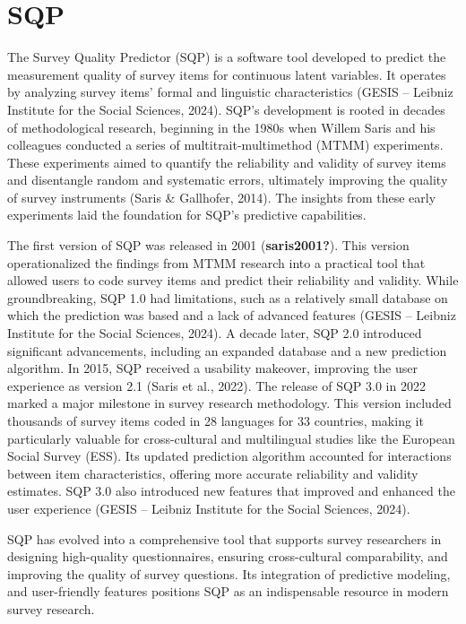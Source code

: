 \documentclass[
  letterpaper,
  DIV=11,
  numbers=noendperiod]{scrartcl}
\begin{document}
\section{SQP}\label{sqp}

The Survey Quality Predictor (SQP) is a software tool developed to
predict the measurement quality of survey items for continuous latent
variables. It operates by analyzing survey items' formal and linguistic
characteristics (GESIS -- Leibniz Institute for the Social Sciences,
2024). SQP's development is rooted in decades of methodological
research, beginning in the 1980s when Willem Saris and his colleagues
conducted a series of multitrait-multimethod (MTMM) experiments. These
experiments aimed to quantify the reliability and validity of survey
items and disentangle random and systematic errors, ultimately improving
the quality of survey instruments (Saris \& Gallhofer, 2014). The
insights from these early experiments laid the foundation for SQP's
predictive capabilities.

The first version of SQP was released in 2001 (\textbf{saris2001?}).
This version operationalized the findings from MTMM research into a
practical tool that allowed users to code survey items and predict their
reliability and validity. While groundbreaking, SQP 1.0 had limitations,
such as a relatively small database on which the prediction was based
and a lack of advanced features (GESIS -- Leibniz Institute for the
Social Sciences, 2024). A decade later, SQP 2.0 introduced significant
advancements, including an expanded database and a new prediction
algorithm. In 2015, SQP received a usability makeover, improving the
user experience as version 2.1 (Saris et al., 2022). The release of SQP
3.0 in 2022 marked a major milestone in survey research methodology.
This version included thousands of survey items coded in 28 languages
for 33 countries, making it particularly valuable for cross-cultural and
multilingual studies like the European Social Survey (ESS). Its updated
prediction algorithm accounted for interactions between item
characteristics, offering more accurate reliability and validity
estimates. SQP 3.0 also introduced new features that improved and
enhanced the user experience (GESIS -- Leibniz Institute for the Social
Sciences, 2024).

SQP has evolved into a comprehensive tool that supports survey
researchers in designing high-quality questionnaires, ensuring
cross-cultural comparability, and improving the quality of survey
questions. Its integration of predictive modeling, and user-friendly
features positions SQP as an indispensable resource in modern survey
research.
\end{document}
